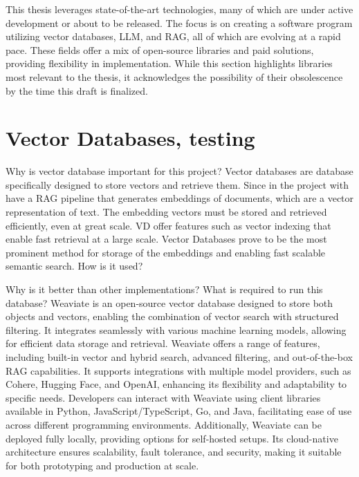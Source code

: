 \cleardoublepage
This thesis leverages state-of-the-art technologies, many of which are under active development or about to be released. The focus is on creating a software program utilizing vector databases, \ac{LLM}, and \ac{RAG}, all of which are evolving at a rapid pace. These fields offer a mix of open-source libraries and paid solutions, providing flexibility in implementation. While this section highlights libraries most relevant to the thesis, it acknowledges the possibility of their obsolescence by the time this draft is finalized.

\section{Vector Databases, testing}
Why is vector database important for this project?
Vector databases are database specifically designed to store vectors and retrieve them. Since in the project with have a RAG pipeline that generates embeddings of documents, which are a vector representation of text. The embedding vectors must be stored and retrieved efficiently, even at great scale. \ac{VD} offer features such as vector indexing that enable fast retrieval at a large scale. Vector Databases prove to be the most prominent method for storage of the embeddings and enabling fast scalable semantic search.
How is it used?


Why is it better than other implementations?
What is required to run this database?
Weaviate \cite{weaviate} is an open-source vector database designed to store both objects and vectors, enabling the combination of vector search with structured filtering. It integrates seamlessly with various machine learning models, allowing for efficient data storage and retrieval. Weaviate offers a range of features, including built-in vector and hybrid search, advanced filtering, and out-of-the-box \ac{RAG} capabilities. It supports integrations with multiple model providers, such as Cohere, Hugging Face, and OpenAI, enhancing its flexibility and adaptability to specific needs. Developers can interact with Weaviate using client libraries available in Python, JavaScript/TypeScript, Go, and Java, facilitating ease of use across different programming environments. Additionally, Weaviate can be deployed fully locally, providing options for self-hosted setups. Its cloud-native architecture ensures scalability, fault tolerance, and security, making it suitable for both prototyping and production at scale.

